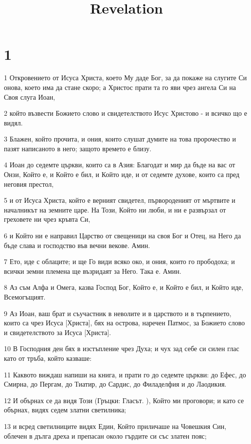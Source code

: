 

\title{Revelation}


\chapter{1}

\par 1 Откровението от Исуса Христа, което Му даде Бог, за да покаже на слугите Си онова, което има да стане скоро; а Христос прати та го яви чрез ангела Си на Своя слуга Иоан,
\par 2 който възвести Божието слово и свидетелството Исус Христово - и всичко що е видял.
\par 3 Блажен, който прочита, и ония, които слушат думите на това пророчество и пазят написаното в него; защото времето е близу.
\par 4 Иоан до седемте църкви, които са в Азия: Благодат и мир да бъде на вас от Онзи, Който е, и Който е бил, и Който иде, и от седемте духове, които са пред неговия престол,
\par 5 и от Исуса Христа, който е верният свидетел, първороденият от мъртвите и началникът на земните царе. На Този, Който ни люби, и ни е развързал от греховете ни чрез кръвта Си,
\par 6 и Който ни е направил Царство от свещеници на своя Бог и Отец, на Него да бъде слава и господство във вечни векове. Амин.
\par 7 Ето, иде с облаците; и ще Го види всяко око, и ония, които го прободоха; и всички земни племена ще възридаят за Него. Така е. Амин.
\par 8 Аз съм Алфа и Омега, казва Господ Бог, Който е, и Който е бил, и Който иде, Всемогъщият.
\par 9 Аз Иоан, ваш брат и съучастник в неволите и в царството и в търпението, които са чрез Исуса [Христа], бях на острова, наречен Патмос, за Божието слово и свидетелството за Исуса [Христа].
\par 10 В Господния ден бях в изстъпление чрез Духа; и чух зад себе си силен глас като от тръба, който казваше:
\par 11 Каквото виждаш напиши на книга, и прати го до седемте църкви: до Ефес, до Смирна, до Пергам, до Тиатир, до Сардис, до Филаделфия и до Лаодикия.
\par 12 И обърнах се да видя Този (Гръцки: Гласът. ), Който ми проговори; и като се обърнах, видях седем златни светилника;
\par 13 и всред светилниците видях Един, Който приличаше на Човешкия Син, облечен в дълга дреха и препасан около гърдите си със златен пояс;
